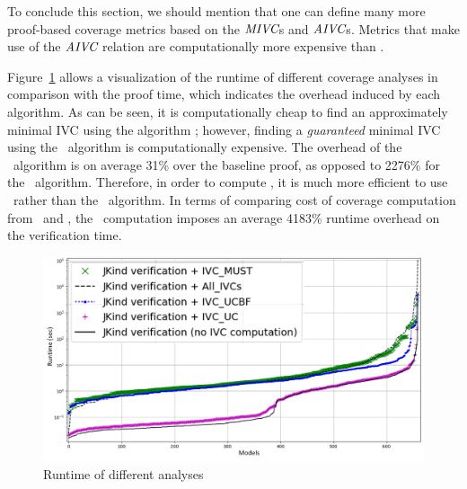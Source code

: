 
To conclude this section, we should mention that one can define many more proof-based coverage metrics based on the $\textit{MIVC}$s and $\textit{AIVC}$s.  Metrics that make use of the $\textit{AIVC}$ relation are computationally more expensive than \ivccov.

Figure~\ref{fig:runtimeall} allows a visualization of the runtime of different coverage analyses
in comparison with the proof time, which indicates the overhead induced by each algorithm.
As can be seen, it is computationally cheap to find an
approximately minimal IVC using the algorithm \ucalg; however, finding a {\em guaranteed}
minimal IVC using the \ucbfalg\ algorithm is computationally expensive. The overhead of the \ucalg\ algorithm is on average 31\% over the baseline proof, as opposed to 2276\% for the \ucbfalg\ algorithm.
Therefore, in order to compute \ivccov, it is much more efficient to use \ucalg\ rather than the \ucbfalg\ algorithm.
In terms of comparing cost of coverage computation from \ivccov\ and \mustcov ,
the \mustcov\ computation imposes an average 4183\% runtime overhead on the verification time.


\begin{figure}
  \centering
  \includegraphics[width=\columnwidth]{figs/timing_cv.jpg}
  \caption{Runtime of different analyses}\label{fig:runtimeall}
\end{figure}


